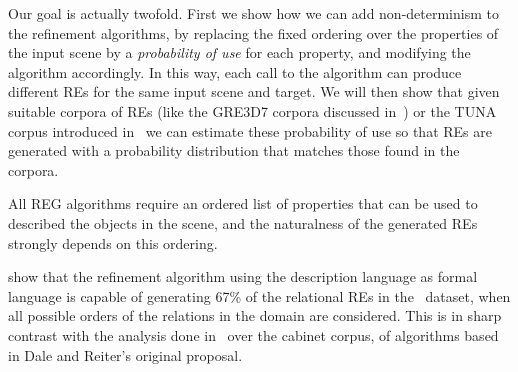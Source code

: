 Our goal is actually twofold. First we show how we can add non-determinism to the refinement algorithms, by replacing the fixed ordering 
over the properties of the input scene by a \emph{probability of use} for each property, and modifying the algorithm accordingly.  
In this way, each call to the algorithm can produce different REs for the same input scene and target.  We will then show that given suitable corpora of REs (like the GRE3D7 corpora discussed in~\cite{viet:gene11}) or the TUNA corpus introduced in~\cite{gatt-balz-kow:2008:ENLG} we can estimate these probability of use so that REs are generated with a probability distribution that matches those found in the corpora.  

All REG algorithms require an 
ordered list of properties that can be used to described the objects in the scene, and the naturalness of the generated REs strongly depends on this ordering. 

show that the refinement algorithm using the description language \el as formal language is capable of generating 67\% of 
the relational REs in the~\cite{viethen06:_algor_for_gener_refer_expres} dataset, when all possible orders of the relations in the domain are considered. This is in sharp contrast with the analysis 
done in~\cite{viethen06:_algor_for_gener_refer_expres} over the cabinet corpus, of algorithms based in Dale and Reiter's original proposal.    

